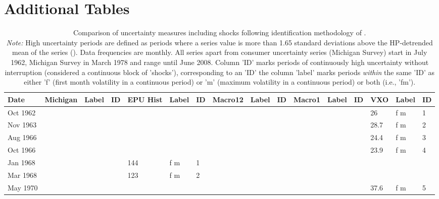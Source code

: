 \documentclass[a4paper,11pt,listof=nochaptergap,oneside,pointednumbers,bibtotoc,bigheadings,liststotoc]{scrbook}
\theoremstyle{mysatz}
\theoremstyle{mydefinition}
\theoremstyle{mybemerkung}
\begin{document}
\section{Additional Tables}
\label{sec:additionalTables}
\begin{spacing}{.3}
\begin{landscape}
    \centering
    \begin{scriptsize}
    \begin{longtable}{|l|lll|lll|lll|lll|lll|}
    \caption[Comparison of uncertainty measures including shocks following identification methodology of \citet{bloom:09}.]{Comparison of uncertainty measures including shocks following identification methodology of \citet{bloom:09}. \\
    \textit{Note:} High uncertainty periods are defined as periods where a series value is more than 1.65 standard deviations above the HP-detrended mean of the series (\citealp{bloom:09}). Data frequencies are monthly. All series apart from consumer uncertainty series (Michigan Survey) start in July 1962, Michigan Survey in March 1978 and range until June 2008. Column 'ID' marks periods of continuously high uncertainty without interruption (considered a continuous block of 'shocks'), corresponding to an 'ID' the column 'label' marks periods \textit{within} the same 'ID' as either 'f' (first month volatility in a continuous period) or 'm' (maximum volatility in a continuous period) or both (i.e., 'fm').}\\    %
\toprule
    \textbf{Date} & \textbf{Michigan} & \textbf{Label} & \textbf{ID} & \textbf{EPU Hist} & \textbf{Label} & \textbf{ID} & \textbf{Macro12} & \textbf{Label} & \textbf{ID} & \textbf{Macro1} & \textbf{Label} & \textbf{ID} & \textbf{VXO} & \textbf{Label} & \textbf{ID} \\ 
    \midrule
    \endhead
       Oct 1962 &  &  &  &  &  &  &  &  &  &  &  &  & 26 & f m & 1 \\
        Nov 1963 &  &  &  &  &  &  &  &  &  &  &  &  & 28.7 & f m & 2 \\
        Aug 1966 &  &  &  &  &  &  &  &  &  &  &  &  & 24.4 & f m & 3 \\
        Oct 1966 &  &  &  &  &  &  &  &  &  &  &  &  & 23.9 & f m & 4 \\
        Jan 1968 &  &  &  & 144 & f m & 1 &  &  &  &  &  &  &  &  &  \\
        Mar 1968 &  &  &  & 123 & f m & 2 &  &  &  &  &  &  &  &  &  \\
        May 1970 &  &  &  &  &  &  &  &  &  &  &  &  & 37.6 & f m & 5 \\

\end{longtable}
\end{scriptsize}
\end{landscape}
\end{spacing}
\end{document}
